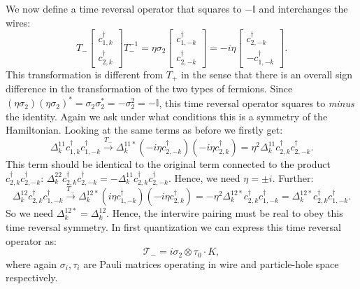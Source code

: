 We now define a time reversal operator that squares to $ - \mathbb{I}$ and interchanges the wires:
\begin{equation}
T_-\begin{bmatrix} c^\dagger_{1,k} \\ c^\dagger_{2,k} \end{bmatrix} T_-^{-1} = \eta\sigma_2 \begin{bmatrix} c^\dagger_{1,-k} \\ c^\dagger_{2,-k} \end{bmatrix} = -i\eta\begin{bmatrix} c^\dagger_{2,-k} \\ - c^\dagger_{1,-k} \end{bmatrix}.\nonumber
\end{equation} 
This transformation is different from $T_+$ in the sense that there is an overall sign difference in the transformation of the two types of fermions. Since $(\eta \sigma_2)(\eta \sigma_2)^* = \sigma_2\sigma_2^* = - \sigma_2^2 = - \mathbb{I}$, this time reversal operator squares to \textit{minus} the identity. Again we ask under what conditions this is a symmetry of the Hamiltonian. Looking at the same terms as before we firstly get:
\begin{equation}
\Delta^{11}_k c^\dagger_{1,k}c^\dagger_{1,-k} \overset{T_-}{\to} \Delta^{11*}_k \left(-i\eta c^\dagger_{2,-k}\right)\left(-i\eta c^\dagger_{2,k}\right) = \eta^2\Delta^{11}_k c^\dagger_{2,k}c^\dagger_{2,-k}. \nonumber
\end{equation}
This term should be identical to the original term connected to the product $c^\dagger_{2,k}c^\dagger_{2,-k}$: $\Delta^{22}_k c^\dagger_{2,k}c^\dagger_{2,-k} = -\Delta^{11}_k c^\dagger_{2,k}c^\dagger_{2,-k}$. Hence, we need $\eta = \pm i$. Further:
\begin{equation}
\Delta^{12}_k c^\dagger_{2,k}c^\dagger_{1,-k} \overset{T_-}{\to} \Delta^{12*}_k \left(i\eta c^\dagger_{1,-k}\right)\left(-i\eta c^\dagger_{2,k}\right) = -\eta^2 \Delta^{12*}_k c^\dagger_{2,k}c^\dagger_{1,-k} = \Delta^{12*}_k c^\dagger_{2,k}c^\dagger_{1,-k}. \nonumber
\end{equation}
So we need $\Delta^{12*}_k = \Delta^{12}_k$. Hence, the interwire pairing must be real to obey this time reversal symmetry. In first quantization we can express this time reversal operator as:
\begin{equation}
\mathcal{T}_- = i\sigma_2\otimes\tau_0 \cdot K, 
\label{eq.2wiresTminuswireexchangefirstquantization}
\end{equation}
where again $\sigma_i, \tau_i$ are Pauli matrices operating in wire and particle-hole space respectively. 

